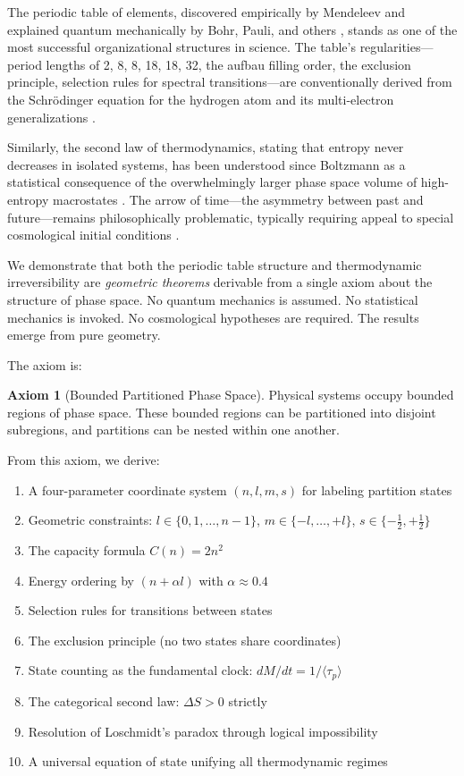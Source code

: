 \documentclass[twocolumn,10pt,a4paper]{article}
\theoremstyle{definition}
\newtheorem{axiom}{Axiom}
\theoremstyle{remark}
\begin{document}
The periodic table of elements, discovered empirically by Mendeleev \cite{mendeleev1869} and explained quantum mechanically by Bohr, Pauli, and others \cite{bohr1913,pauli1925}, stands as one of the most successful organizational structures in science. The table's regularities---period lengths of 2, 8, 8, 18, 18, 32, the aufbau filling order, the exclusion principle, selection rules for spectral transitions---are conventionally derived from the Schr\"{o}dinger equation for the hydrogen atom and its multi-electron generalizations \cite{schrodinger1926,dirac1928}.

Similarly, the second law of thermodynamics, stating that entropy never decreases in isolated systems, has been understood since Boltzmann as a statistical consequence of the overwhelmingly larger phase space volume of high-entropy macrostates \cite{boltzmann1877,gibbs1902}. The arrow of time---the asymmetry between past and future---remains philosophically problematic, typically requiring appeal to special cosmological initial conditions \cite{penrose1989,albert2000}.

We demonstrate that both the periodic table structure and thermodynamic irreversibility are \emph{geometric theorems} derivable from a single axiom about the structure of phase space. No quantum mechanics is assumed. No statistical mechanics is invoked. No cosmological hypotheses are required. The results emerge from pure geometry.

The axiom is:

\begin{axiom}[Bounded Partitioned Phase Space]
\label{axiom:main}
Physical systems occupy bounded regions of phase space. These bounded regions can be partitioned into disjoint subregions, and partitions can be nested within one another.
\end{axiom}

From this axiom, we derive:

\begin{enumerate}[label=(\roman*)]
    \item A four-parameter coordinate system $(n, l, m, s)$ for labeling partition states
    \item Geometric constraints: $l \in \{0, 1, \ldots, n-1\}$, $m \in \{-l, \ldots, +l\}$, $s \in \{-\frac{1}{2}, +\frac{1}{2}\}$
    \item The capacity formula $C(n) = 2n^2$
    \item Energy ordering by $(n + \alpha l)$ with $\alpha \approx 0.4$
    \item Selection rules for transitions between states
    \item The exclusion principle (no two states share coordinates)
    \item State counting as the fundamental clock: $dM/dt = 1/\langle\tau_p\rangle$
    \item The categorical second law: $\Delta S > 0$ strictly
    \item Resolution of Loschmidt's paradox through logical impossibility
    \item A universal equation of state unifying all thermodynamic regimes
\end{enumerate}
\end{document}
